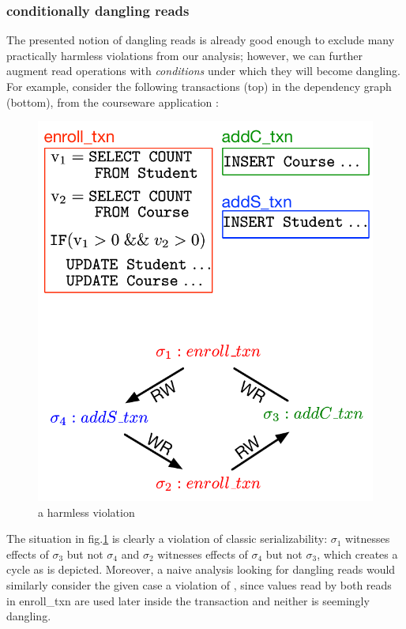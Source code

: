\documentclass{vldb}
\begin{document}
\subsubsection{conditionally dangling reads}
The presented notion of dangling reads is already good enough to exclude many
practically harmless violations from our analysis; however, we can
further augment read operations with \emph{conditions} under which
they will become dangling. For example, consider the following transactions
(top)
in the dependency graph (bottom), from the courseware
application \cite{Gotsman:cise}: 
\begin{figure}[h]
  \begin{center}
    \includegraphics[scale=0.5]{figures/conditional_dangling.pdf}
  \end{center}
  \caption{a harmless violation}
  \label{fig:dangling}
\end{figure}

The situation in fig.\ref{fig:dangling} is clearly a violation of
classic serializability: $\sigma_1$ witnesses effects of
$\sigma_3$ but not $\sigma_4$ and $\sigma_2$ witnesses effects of
$\sigma_4$ but not $\sigma_3$, which creates a cycle as is depicted.
Moreover, a naive analysis looking for dangling reads would similarly
consider the given case a violation of \es, since values read by both reads
in enroll\_txn are used later inside the transaction and neither is seemingly
dangling. 
\end{document}
